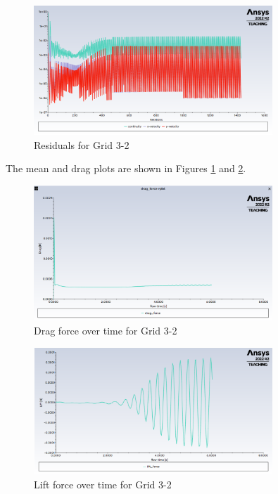 \begin{figure}[H]
    \centering
    \includegraphics[width=0.8\textwidth]{Questions/Figures/residuals plot grid 3 2.png}
    \caption{Residuals for Grid 3-2}
\end{figure}

The mean and drag plots are shown in Figures \ref{fig:drag force plot grid 3 2} and \ref{fig:lift force plot grid 3 2}.
\begin{figure}[H]
    \centering
    \includegraphics[width=0.8\textwidth]{Questions/Figures/drag force plot grid 3 2.png}
    \caption{Drag force over time for Grid 3-2}
    \label{fig:drag force plot grid 3 2}
\end{figure}
\begin{figure}[H]
    \centering
    \includegraphics[width=0.8\textwidth]{Questions/Figures/lift force plot grid 3 2.png}
    \caption{Lift force over time for Grid 3-2}
    \label{fig:lift force plot grid 3 2}
\end{figure}
